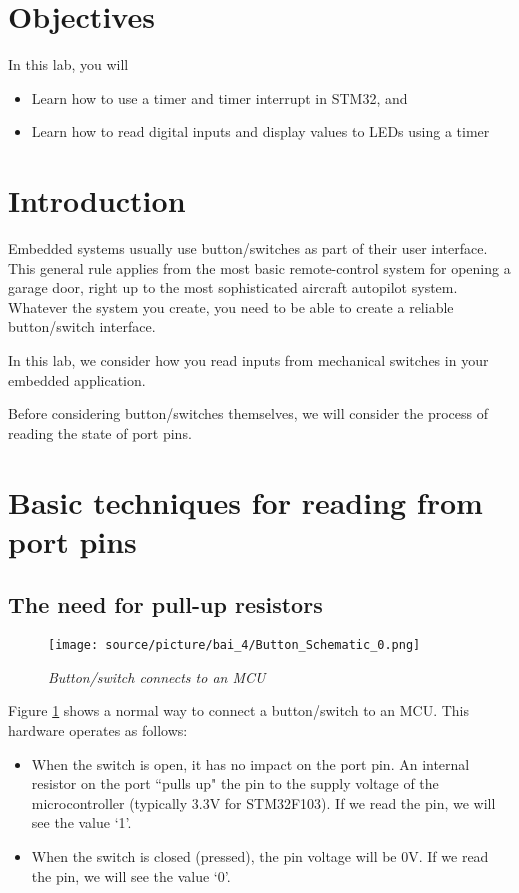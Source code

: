 

\section{Objectives}
In this lab, you will
\begin{itemize}
    \item Learn how to use a timer and timer interrupt in STM32, and 
    \item Learn how to read digital inputs and display values to LEDs using a timer
\end{itemize}

\section{Introduction}
Embedded systems usually use button/switches as part of their user interface. This general rule applies from the most basic remote-control system for opening a garage door, right up to the most sophisticated aircraft autopilot system. Whatever the system you create, you need to be able to create a reliable button/switch interface. 


In this lab, we consider how you read inputs from mechanical switches in your embedded application. 

Before considering button/switches themselves, we will consider the process of reading the state of port pins.

\section{Basic techniques for reading from port pins}

\subsection{The need for pull-up resistors}
\begin{figure}[!htp]
    \centering
    \texttt{[image: source/picture/bai\_4/Button\_Schematic\_0.png]}
    \caption{\textit{Button/switch connects to an MCU}}
    \label{bai4_pic_button_schematic_0}
\end{figure}
Figure \ref{bai4_pic_button_schematic_0} shows a normal way to connect a button/switch to an MCU. This hardware operates as follows:
\begin{itemize}
    \item When the switch is open, it has no impact on the port pin. An internal resistor on the port ``pulls up" the pin to the supply voltage of the microcontroller (typically 3.3V for STM32F103). If we read the pin, we will see the value `1'. 
    \item When the switch is closed (pressed), the pin voltage will be 0V. If we read the pin, we will see the value `0'. 
\end{itemize}
 
